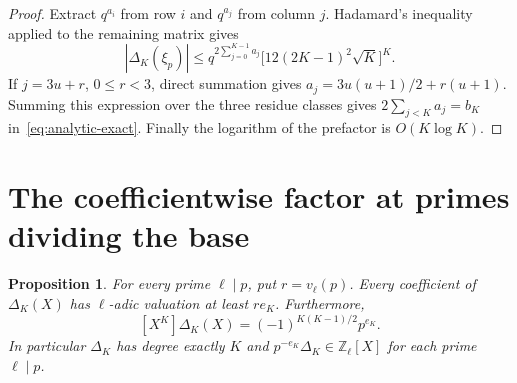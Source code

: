 \documentclass[11pt,letterpaper]{article}
\numberwithin{equation}{section}
\newtheorem{proposition}[theorem]{Proposition}
\theoremstyle{remark}
\newcommand{\Z}{\mathbb Z}
\begin{document}
\begin{proof}
Extract $q^{a_i}$ from row $i$ and $q^{a_j}$ from column $j$. Hadamard's inequality applied to the remaining matrix gives
\begin{equation*}
 |\Delta_K(\xi_p)|\le
 q^{2\sum_{j=0}^{K-1}a_j}\bigl[12(2K-1)^2\sqrt K\bigr]^K.
\end{equation*}
If $j=3u+r$, $0\le r<3$, direct summation gives $a_j=3u(u+1)/2+r(u+1)$. Summing this expression over the three residue classes gives $2\sum_{j<K}a_j=b_K$ in~\eqref{eq:analytic-exact}. Finally the logarithm of the prefactor is $O(K\log K)$.
\end{proof}

\section{The coefficientwise factor at primes dividing the base}

\begin{proposition}\label{prop:content}
For every prime $\ell\mid p$, put $r=v_\ell(p)$. Every coefficient of $\Delta_K(X)$ has $\ell$-adic valuation at least $re_K$. Furthermore,
\begin{equation}\label{eq:leading}
 [X^K]\Delta_K(X)=(-1)^{K(K-1)/2}p^{e_K}.
\end{equation}
In particular $\Delta_K$ has degree exactly $K$ and $p^{-e_K}\Delta_K\in\Z_\ell[X]$ for each prime $\ell\mid p$.
\end{proposition}
\end{document}
